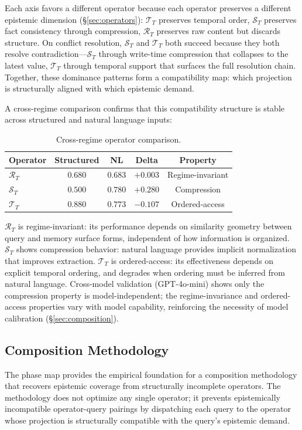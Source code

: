 \documentclass[letterpaper,twocolumn,10pt]{article}
\begin{document}
Each axis favors a different operator because each operator preserves a different epistemic dimension (\S\ref{sec:operators}): $\mathcal{T}_T$ preserves temporal order, $\mathcal{S}_T$ preserves fact consistency through compression, $\mathcal{R}_T$ preserves raw content but discards structure. On conflict resolution, $\mathcal{S}_T$ and $\mathcal{T}_T$ both succeed because they both resolve contradiction---$\mathcal{S}_T$ through write-time compression that collapses to the latest value, $\mathcal{T}_T$ through temporal support that surfaces the full resolution chain. Together, these dominance patterns form a compatibility map: which projection is structurally aligned with which epistemic demand.

A cross-regime comparison confirms that this compatibility structure is stable across structured and natural language inputs:

\begin{table}[t]
\caption{Cross-regime operator comparison.}
\centering
\footnotesize
\begin{tabular}{lcccc}
\toprule
Operator & Structured & NL & Delta & Property \\
\midrule
$\mathcal{R}_T$ & $0.680$ & $0.683$ & $+0.003$ & Regime-invariant\\
$\mathcal{S}_T$ & $0.500$ & $0.780$ & $+0.280$ & Compression\\
$\mathcal{T}_T$ & $0.880$ & $0.773$ & $-0.107$ & Ordered-access\\
\bottomrule
\end{tabular}
\end{table}

$\mathcal{R}_T$ is regime-invariant: its performance depends on similarity geometry between query and memory surface forms, independent of how information is organized. $\mathcal{S}_T$ shows compression behavior: natural language provides implicit normalization that improves extraction. $\mathcal{T}_T$ is ordered-access: its effectiveness depends on explicit temporal ordering, and degrades when ordering must be inferred from natural language. Cross-model validation (GPT-4o-mini) shows only the compression property is model-independent; the regime-invariance and ordered-access properties vary with model capability, reinforcing the necessity of model calibration (\S\ref{sec:composition}).

\subsection{Composition Methodology}
The phase map provides the empirical foundation for a composition methodology that recovers epistemic coverage from structurally incomplete operators. The methodology does not optimize any single operator; it prevents epistemically incompatible operator-query pairings by dispatching each query to the operator whose projection is structurally compatible with the query's epistemic demand.
\end{document}
